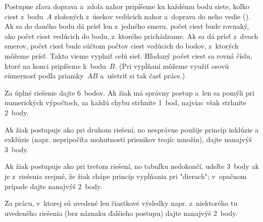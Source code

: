 {\ineriesenie
Postupne zľava doprava a~zdola nahor pripíšeme ku každému bodu siete, koľko ciest z~bodu~$A$ zložených z~úsekov vedúcich nahor a~doprava do neho vedie (\obr). Ak sa do daného bodu dá prísť len z~jedného smeru, počet ciest bude rovnaký, ako počet ciest vedúcich do bodu, z~ktorého prichádzame. Ak sa dá prísť z~dvoch smerov, počet ciest bude súčtom počtov ciest vedúcich do bodov, z~ktorých môžeme prísť. Takto vieme vyplniť celú sieť. Hľadaný počet ciest sa rovná číslu, ktoré na konci pripíšeme k~bodu~$B$. (Pri vypĺňaní môžeme využiť osovú súmernosť podľa priamky~$AB$ a~ušetriť si tak časť práce.)
%

\nobreak\medskip\petit\noindent
Za úplné riešenie dajte 6~bodov. Ak žiak má správny postup a~len sa pomýli pri numerických výpočtoch, za každú chybu strhnite 1~bod, najviac však strhnite 2~body.

Ak žiak postupuje ako pri druhom riešení, no nesprávne použije princíp inklúzie a exklúzie (napr. nepripočíta mohutnosti prienikov trojíc množín), dajte nanajvýš 3~body.

Ak žiak postupuje ako pri treťom riešení, no tabuľku nedokončí, udeľte 3~body ak je z~riešenia zrejmé, že žiak chápe princíp vypĺňania pri "dierach"; v~opačnom prípade dajte nanajvýš 2~body.

Za prácu, v~ktorej sú uvedené len čiastkové výsledky napr. z~niektorého tu uvedeného riešenia (bez náznaku ďalšieho postupu) dajte nanajvýš 2~body.

\endpetit
\bigbreak
}

